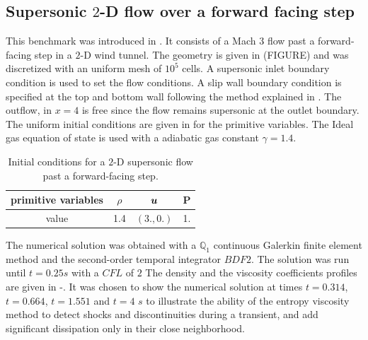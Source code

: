 \subsection{Supersonic $2$-D flow over a forward facing step} \label{sec:2d-forward-facing-step}
This benchmark was introduced in \cite{FFS}. It consists of a Mach 3 flow past a forward-facing step in a $2$-D wind tunnel. The geometry is given in (FIGURE) and was discretized with an uniform mesh of $10^5$ cells. A supersonic inlet boundary condition is used to set the flow conditions. A slip wall boundary condition is specified at the top and bottom wall following the method explained in . The outflow, in $x=4$ is free since the flow remains supersonic at the outlet boundary. The uniform initial conditions are given in  for the primitive variables. The Ideal gas equation of state is used with a adiabatic gas constant $\gamma = 1.4$.
\begin{table}[H] 
\caption{\label{tb:ic-forward-facing} Initial conditions for a $2$-D supersonic flow past a forward-facing step.}
\begin{center}
\begin{tabular}{|c|c|c|c|}
\hline
 primitive variables   & $\rho$ & $\boldsymbol u$ & P \\ \hline
value & 1.4 & $(3.,0.)$ & 1.\\ \hline
\end{tabular}
\end{center}
\nonumber
\end{table}
The numerical solution was obtained with a $\mathbb Q_1$ continuous Galerkin finite element method and the second-order temporal integrator $BDF2$. The solution was run until $t=0.25s$ with a $CFL$ of $2$ The density and the viscosity coefficients profiles are given in -. It was chosen to show the numerical solution at times $t=0.314$, $t=0.664$, $t=1.551$ and $t=4$ $s$ to illustrate the ability of the entropy viscosity method to detect shocks and discontinuities during a transient, and add significant dissipation only in their close neighborhood. 
